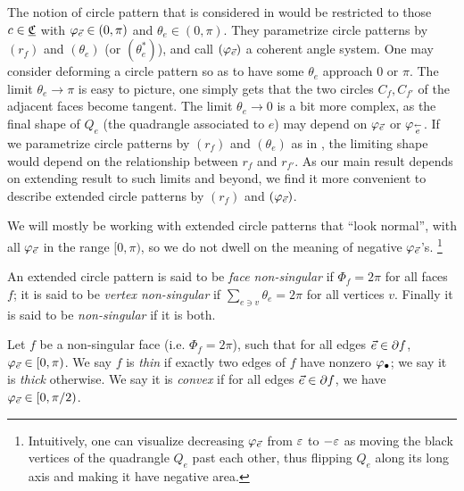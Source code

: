 The notion of circle pattern that is considered in \cite{BandS}
would be restricted to those $c\in {\underline{\mathfrak{C}}}$
with $\varphi_{\vec{e}} \in (0,\pi)$ and $\theta_e \in (0,\pi)$.
They parametrize circle patterns by $(r_f)$ and $(\theta_e)$
(or $(\theta_e^*)$),
and call $(\varphi_{\vec{e}})$ a coherent angle system.
One may consider deforming a circle pattern so as to have
some $\theta_e$ approach 0 or $\pi$.
The limit $\theta_e \to \pi$ is easy to picture, one simply gets that the two circles
$C_f, C_{f'}$ of the adjacent faces become tangent. The limit $\theta_e \to 0$
is a bit more complex, as the final shape of $Q_e$ (the quadrangle associated to $e$)
may depend on $\varphi_{\vec{e}}$ or $\varphi_{\overset{\leftarrow}{e}}$.
If we parametrize circle patterns by $(r_f)$ and $(\theta_e)$ as in \cite{BandS},
the limiting shape would depend on the relationship between 
$r_f$ and $r_{f'}$.
As our main result depends on extending \cite{BandS} result
to such limits and beyond,
we find it more convenient to describe extended circle patterns by
$(r_f)$ and $(\varphi_{\vec{e}})$.


We will mostly be working with extended circle patterns that ``look normal'',
with all $\varphi_{\vec{e}}$ in the range $[0,\pi)$,
so we do not dwell on the meaning of negative $\varphi_{\vec{e}}$'s.
\footnote{
Intuitively, one can visualize decreasing $\varphi_{\vec{e}}$
from $\varepsilon$ to $-\varepsilon$
as moving the black vertices of the quadrangle $Q_e$ past each other,
thus flipping $Q_e$ along its long axis
and making it have negative area.
}

\begin{define}
An extended circle pattern is said to be \emph{face non-singular}
if $\Phi_f = 2\pi$ for all faces $f$; it is said to be \emph{vertex non-singular}
if $\sum_{e \ni v} \theta_e = 2\pi$ for all vertices $v$.
Finally it is said to be \emph{non-singular} if it is both.
\end{define}


\begin{define}
Let $f$ be a non-singular face (i.e. $\Phi_f = 2\pi$),
such that for all edges $\vec{e} \in \partial f$,
$\varphi_{\vec{e}} \in [0,\pi)$.
We say $f$ is \emph{thin} if
exactly two edges of $f$ have nonzero $\varphi_\bullet$;
we say it is \emph{thick} otherwise.
We say it is \emph{convex} if for all edges $\vec{e} \in \partial f$,
we have $\varphi_{\vec{e}} \in [0,\pi/2)$.
\end{define}



